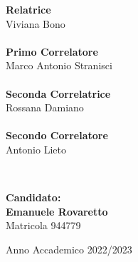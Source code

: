 \begin{titlepage}
{    \begin{minipage}[t]{0.47\textwidth}
        {\large{\bf Relatrice}\\
            Viviana Bono}\\
        \vspace{4mm}
        \\
        {\large{\bf Primo Correlatore}\\
        Marco Antonio Stranisci\\
        }\\
        {\large{\bf Seconda Correlatrice}\\
        Rossana Damiano\\ 
        }\\
        {\large{\bf Secondo Correlatore}\\
        Antonio Lieto\\ 
        }
    \end{minipage}
    \\
    \null\hfill
    \begin{minipage}[t]{0.40\textwidth}
        \vspace{10mm}
        {\large{\bf Candidato:\\
                Emanuele Rovaretto \\ %
            } \large{Matricola 944779}} %
    \end{minipage}
    \vspace{10mm}
    \begin{center}
        {\large{Anno Accademico 2022/2023}}
    \end{center}
	}
\end{titlepage}